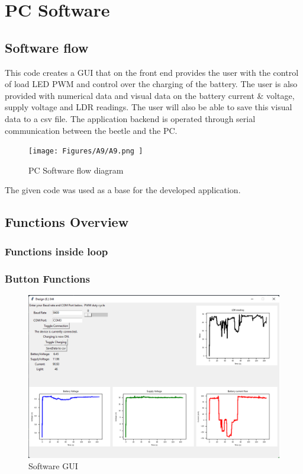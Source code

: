 \chapter{PC Software}
\section{Software flow}
 This code creates a GUI that on the front end provides the user with the control of load LED PWM and control over the charging of the battery. The user is also provided with numerical data and visual data  on the battery current \& voltage, supply voltage and LDR readings. The user will also be able to save this visual data to a csv file. The application backend is operated through serial communication between the beetle and the PC.
\begin{figure}[!htb]
	\centering
	\texttt{[image: Figures/A9/A9.png	]}
	\caption{PC Software flow diagram}
	\label{fig:flow}
\end{figure}



The given code was used as a base for the developed application\cite{}. 
\section{Functions Overview}
\subsection{Functions inside loop}
\subsection{Button Functions}



\begin{figure}[!htb]
	\centering
	\includegraphics[width=1\linewidth]{Figures/A9/GUI.png}
	\caption{Software GUI}
	\label{fig:flow}
\end{figure}